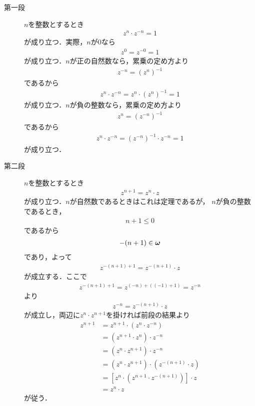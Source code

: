 	\begin{sketch}\mbox{}
		\begin{description}
			\item[第一段]
				$n$を整数とするとき
				\begin{align}
					z^{n} \cdot z^{-n} = 1
					\label{fom:thm_exponential_law_of_complex_numbers_1}
				\end{align}
				が成り立つ．実際，$n$が$0$なら
				\begin{align}
					z^{0} =  z^{-0} = 1
				\end{align}
				が成り立つ．$n$が正の自然数なら，累乗の定め方より
				\begin{align}
					z^{-n} = (z^{n})^{-1}
				\end{align}
				であるから
				\begin{align}
					z^{n} \cdot z^{-n} = z^{n} \cdot (z^{n})^{-1} = 1
				\end{align}
				が成り立つ．$n$が負の整数なら，累乗の定め方より
				\begin{align}
					z^{n} = (z^{-n})^{-1}
				\end{align}
				であるから
				\begin{align}
					z^{n} \cdot z^{-n} = (z^{-n})^{-1} \cdot z^{-n} = 1
				\end{align}
				が成り立つ．
				
			\item[第二段]
				$n$を整数とするとき
				\begin{align}
					z^{n+1} = z^{n} \cdot z
					\label{fom:thm_exponential_law_of_complex_numbers_2}
				\end{align}
				が成り立つ．$n$が自然数であるときはこれは定理であるが，
				$n$が負の整数であるとき，
				\begin{align}
					n+1 \leq 0
				\end{align}
				であるから
				\begin{align}
					-(n+1) \in {\boldsymbol \omega}
				\end{align}
				であり，よって
				\begin{align}
					z^{-(n+1) + 1} = z^{-(n+1)} \cdot z
				\end{align}
				が成立する．ここで
				\begin{align}
					z^{-(n+1) + 1} = z^{(-n) + ((-1) + 1)} = z^{-n}
				\end{align}
				より
				\begin{align}
					z^{-n} = z^{-(n+1)} \cdot z
				\end{align}
				が成立し，両辺に$z^{n} \cdot z^{n+1}$を掛ければ前段の結果より
				\begin{align}
					z^{n+1} &= z^{n+1} \cdot (z^{n} \cdot z^{-n}) \\
					&= (z^{n+1} \cdot z^{n}) \cdot z^{-n} \\
					&= (z^{n} \cdot z^{n+1}) \cdot z^{-n} \\
					&= (z^{n} \cdot z^{n+1}) \cdot (z^{-(n+1)} \cdot z) \\
					&= \left[z^{n} \cdot (z^{n+1} \cdot z^{-(n+1)})\right] \cdot z \\
					&= z^{n} \cdot z
				\end{align}
				が従う．
				

\end{description}
\end{sketch}
